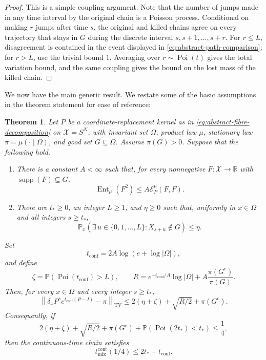 \documentclass[11pt, reqno]{amsart}
\numberwithin{equation}{section}
\newtheorem{theorem}{Theorem}[section]
\newcommand{\Ent}{\operatorname{Ent}}
\newcommand{\TV}{\mathrm{TV}}
\newcommand{\Prob}{\mathbb P}
\newcommand{\cE}{\mathcal E}
\newcommand{\supp}{\operatorname{supp}}
\begin{document}
\begin{proof}
This is a simple coupling argument. Note that the number of jumps made in any time interval by the original chain is a Poisson process. Conditional on making \(r\) jumps
after time \(s\), the original and killed chains agree on every trajectory that
stays in \(G\) during the discrete interval \(s,s+1,\ldots,s+r\).  For
\(r\le L\), disagreement is contained in the event displayed in
\eqref{eq:abstract-path-comparison}; for \(r>L\), use the trivial bound \(1\).
Averaging over \(r\sim\operatorname{Poi}(t)\) gives the total variation bound,
and the same coupling gives the bound on the lost mass of the killed chain.
\end{proof}

We now have the main generic result. We restate some of the basic assumptions in the theorem statement for ease of reference:

\begin{theorem}\label{thm:abstract-good-set}
Let \(P\) be a coordinate-replacement kernel as in
\eqref{eq:abstract-fibre-decomposition} on \(\mathcal X=S^N\), with invariant
set \(\Omega\), product law \(\mu\), stationary law \(\pi=\mu(\cdot\mid\Omega)\),
and good set \(G\subseteq\Omega\).  Assume \(\pi(G)>0\).  Suppose that the
following hold.
\begin{enumerate}[label=\textup{(\roman*)}, leftmargin=*]
    \item There is a constant \(A<\infty\) such that, for every nonnegative
    \(F:\mathcal X\to\mathbb R\) with \(\supp(F)\subseteq G\),
    \[
        \Ent_\mu(F^2)\le A\cE_P^\mu(F,F).
    \]
    \item There are \(t_*\ge0\), an integer \(L\ge1\), and \(\eta\ge0\) such
    that, uniformly in \(x\in\Omega\) and all integers \(s\ge t_*\),
    \[
        \Prob_x(\exists\,u\in\{0,1,\ldots,L\}:X_{s+u}\notin G)\le\eta.
    \]
\end{enumerate}
Set
\begin{equation}\label{eq:abstract-tconf}
    t_{\mathrm{conf}}=2A\log(e+\log|\Omega|),
\end{equation}
and define
\begin{equation}\label{eq:abstract-error-defs}
    \zeta=\Prob(\operatorname{Poi}(t_{\mathrm{conf}})>L),
    \qquad
    R=e^{-t_{\mathrm{conf}}/A}\log|\Omega|+A\frac{\pi(G^c)}{\pi(G)}.
\end{equation}
Then, for every \(x\in\Omega\) and every integer \(s\ge t_*\),
\begin{equation}\label{eq:abstract-after-burnin}
    \left\|\delta_xP^s e^{t_{\mathrm{conf}}(P-I)}-\pi\right\|_{\TV}
    \le 2(\eta+\zeta)+\sqrt{R/2}+\pi(G^c).
\end{equation}
Consequently, if
\begin{equation}\label{eq:abstract-continuous-condition}
    2(\eta+\zeta)+\sqrt{R/2}+\pi(G^c)
    +\Prob(\operatorname{Poi}(2t_*)<t_*)\le\frac14,
\end{equation}
then the continuous-time chain satisfies
\[
    t_{\mathrm{mix}}^{\mathrm{cont}}(1/4)\le 2t_*+t_{\mathrm{conf}}.
\]
\end{theorem}
\end{document}
